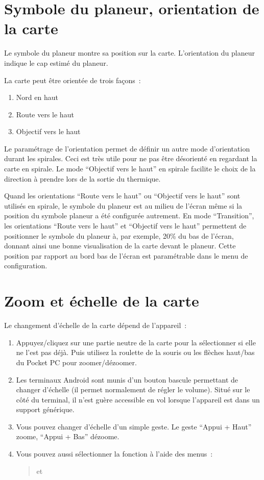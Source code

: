 \section{Symbole du planeur, orientation de la carte}
Le symbole du planeur montre sa position sur la carte. L'orientation du planeur indique le cap estimé du planeur.

La carte peut être orientée de trois façons~: 
\begin{enumerate}
\item Nord en haut
\item Route vers le haut
\item Objectif vers le haut
\end{enumerate}
Le paramétrage de l'orientation  permet de définir un autre mode d'orientation durant les spirales. Ceci est très utile pour ne pas être désorienté en regardant la carte en spirale. Le mode ``Objectif vers le haut'' en spirale facilite le choix de la direction à prendre lors de la sortie du thermique.

Quand les orientations ``Route vers le haut'' ou ``Objectif vers le haut'' sont utilisés en spirale, le symbole du planeur est au milieu de l'écran même si la position du symbole planeur a été configurée autrement.
En mode ``Transition'', les orientations ``Route vers le haut'' et ``Objectif vers le haut'' permettent de positionner le symbole du planeur à, par exemple, 20\% du bas de l'écran, donnant ainsi une bonne visualisation de la carte devant le planeur. Cette position par rapport au bord bas de l'écran est paramétrable dans le menu de
 configuration.

\section{Zoom et échelle de la carte}\label{sec:zooming}

Le changement d'échelle de la carte dépend de l'appareil~:
\begin{enumerate}
\item Appuyez/cliquez sur une partie neutre de la carte pour la sélectionner si elle ne l'est pas déjà.
Puis utilisez la roulette de la souris ou les flèches haut/bas du Pocket PC pour zoomer/dézoomer.
\item Les terminaux Android sont munis d'un bouton bascule permettant de changer d'échelle (il permet normalement de régler le volume). Situé sur le côté du terminal, il n'est guère accessible en vol lorsque l'appareil est dans un support générique.
\item Vous pouvez changer d'échelle d'un simple geste. Le geste  
``Appui + Haut'' zoome, ``Appui + Bas'' dézoome.
\item Vous pouvez aussi sélectionner la fonction à l'aide des menus~:
\begin{quote}
\blink{} et \blink{}
\end{quote}
\end{enumerate}

